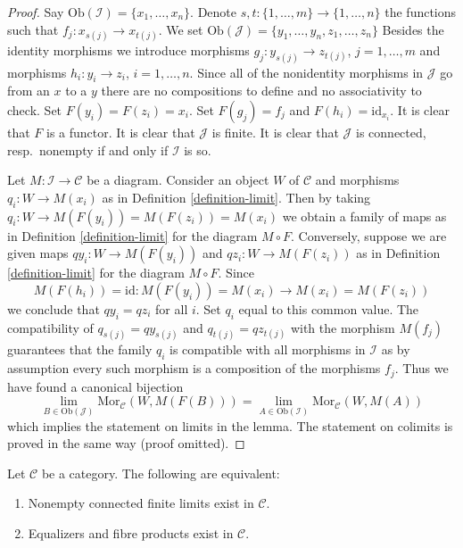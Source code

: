 \begin{proof}
Say $\text{Ob}(\mathcal{I}) = \{x_1, \ldots, x_n\}$.
Denote $s, t : \{1, \ldots, m\} \to \{1, \ldots, n\}$ the functions
such that $f_j : x_{s(j)} \to x_{t(j)}$.
We set $\text{Ob}(\mathcal{J}) = \{y_1, \ldots, y_n, z_1, \ldots, z_n\}$
Besides the identity morphisms we introduce morphisms
$g_j : y_{s(j)} \to z_{t(j)}$, $j = 1, \ldots, m$ and morphisms
$h_i : y_i \to z_i$, $i = 1, \ldots, n$. Since all of the nonidentity
morphisms in $\mathcal{J}$ go from an $x$ to a $y$ there are no
compositions to define and no associativity to check.
Set $F(y_i) = F(z_i) = x_i$. Set $F(g_j) = f_j$ and $F(h_i) = \text{id}_{x_i}$.
It is clear that $F$ is a functor.
It is clear that $\mathcal{J}$ is finite.
It is clear that $\mathcal{J}$ is connected, resp.\ nonempty
if and only if $\mathcal{I}$ is so.

\medskip\noindent
Let $M : \mathcal{I} \to \mathcal{C}$ be a diagram.
Consider an object $W$ of $\mathcal{C}$ and morphisms
$q_i : W \to M(x_i)$ as in
Definition \ref{definition-limit}.
Then by taking $q_i : W \to M(F(y_i)) = M(F(z_i)) = M(x_i)$ we obtain
a family of maps as in
Definition \ref{definition-limit}
for the diagram $M \circ F$.
Conversely, suppose we are given maps
$qy_i : W \to M(F(y_i))$ and $qz_i : W \to M(F(z_i))$
as in
Definition \ref{definition-limit}
for the diagram $M \circ F$. Since
$$
M(F(h_i)) = \text{id} : M(F(y_i)) = M(x_i) \longrightarrow M(x_i) = M(F(z_i))
$$
we conclude that $qy_i = qz_i$ for all $i$. Set $q_i$ equal to this common
value. The compatibility of
$q_{s(j)} = qy_{s(j)}$ and $q_{t(j)} = qz_{t(j)}$ with the morphism
$M(f_j)$ guarantees that the family $q_i$ is compatible with all morphisms
in $\mathcal{I}$ as by assumption every such morphism is a composition
of the morphisms $f_j$. Thus we have found a canonical bijection
$$
\lim_{B \in \text{Ob}(\mathcal{J})} \text{Mor}_{\mathcal{C}}(W, M(F(B)))
=
\lim_{A \in \text{Ob}(\mathcal{I})} \text{Mor}_{\mathcal{C}}(W, M(A))
$$
which implies the statement on limits in the lemma. The statement on colimits
is proved in the same way (proof omitted).
\end{proof}

\begin{lemma}
\label{lemma-fibre-products-equalizers-exist}
Let $\mathcal{C}$ be a category.
The following are equivalent:
\begin{enumerate}
\item Nonempty connected finite limits exist in $\mathcal{C}$.
\item Equalizers and fibre products exist in $\mathcal{C}$.
\end{enumerate}
\end{lemma}

